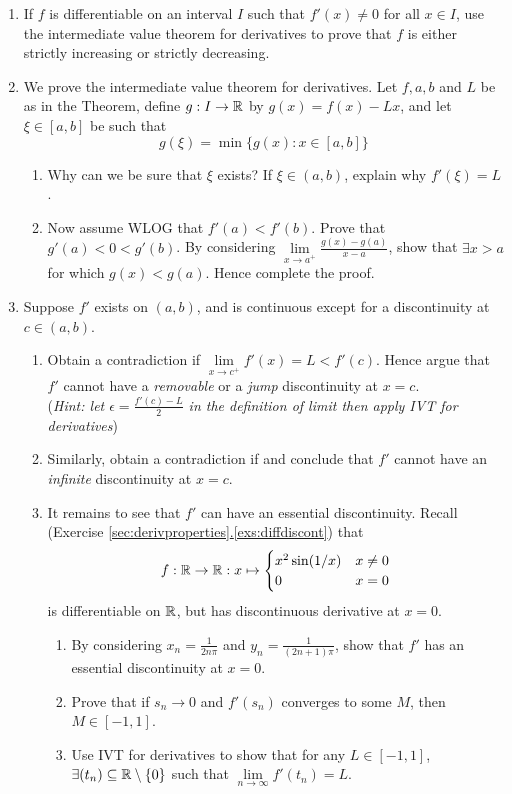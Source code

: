 \begin{exercises}
\begin{enumerate}
  \item\label{exs:fincdec} If $f$ is differentiable on an interval $I$ such that $f'(x)\neq 0$ for all $x\in I$, use the intermediate value theorem for derivatives to prove that $f$ is either strictly increasing or strictly decreasing.
  
  \item We prove the intermediate value theorem for derivatives. Let $f,a,b$ and $L$ be as in the Theorem, define $g:I\to\mathbb{R}$ by $g(x)=f(x)-Lx$, and let $\xi\in[a,b]$ be such that
	\[g(\xi)=\min\{g(x):x\in[a,b]\}\]
	\begin{enumerate}
	  \item Why can we be sure that $\xi$ exists? If $\xi\in(a,b)$, explain why $f'(\xi)=L$.
		\item Now assume WLOG that $f'(a)<f'(b)$. Prove that $g'(a)<0<g'(b)$. By considering $\lim\limits_{x\to a^+}\frac{g(x)-g(a)}{x-a}$, show that $\exists x>a$ for which $g(x)<g(a)$. Hence complete the proof.
	\end{enumerate}
  
  \item Suppose $f'$ exists on $(a,b)$, and is continuous except for a discontinuity at $c\in(a,b)$.
  \begin{enumerate}
    \item Obtain a contradiction if $\lim\limits_{x\to c^+}f'(x)=L<f'(c)$. Hence argue that $f'$ cannot have a \emph{removable} or a \emph{jump} discontinuity at $x=c$.\\
    (\emph{Hint: let $\epsilon=\frac{f'(c)-L}2$ in the definition of limit then apply IVT for derivatives})
    \item Similarly, obtain a contradiction if  and conclude that $f'$ cannot have an \emph{infinite} discontinuity at $x=c$.
  	\item It remains to see that $f'$ can have an essential discontinuity. Recall (Exercise \hyperref[exs:diffdiscont]{\ref*{sec:derivproperties}.\ref*{exs:diffdiscont}}) that
		\[f:\mathbb{R}\to\mathbb{R}:x\mapsto \begin{cases}
		x^2\sin(1/x)&x\neq 0\\
		0&x=0
		\end{cases}\]
		is differentiable on $\mathbb{R}$, but has discontinuous derivative at $x=0$.
		\begin{enumerate}
  		\item By considering $x_n=\frac 1{2n\pi}$ and $y_n=\frac 1{(2n+1)\pi}$, show that $f'$ has an essential discontinuity at $x=0$.
  		\item Prove that if $s_n\to 0$ and $f'(s_n)$ converges to some $M$, then $M\in[-1,1]$.
			\item Use IVT for derivatives to show that for any $L\in[-1,1]$, $\exists (t_n)\subseteq\mathbb{R}\setminus\{0\}$ such that $\lim\limits_{n\to \infty}f'(t_n)=L$. 
		\end{enumerate}
  \end{enumerate}
\end{enumerate}
\end{exercises}

